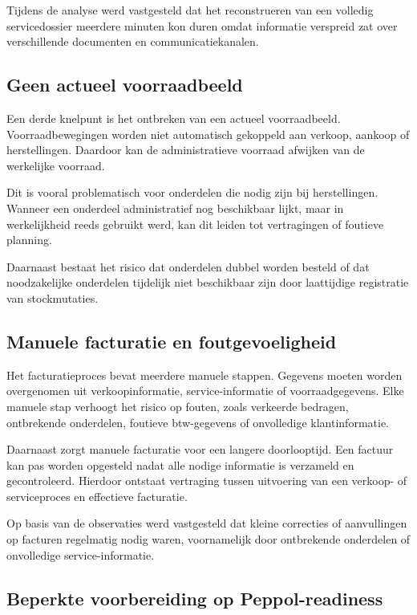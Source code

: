 Tijdens de analyse werd vastgesteld dat het reconstrueren van een volledig servicedossier meerdere minuten kon duren omdat informatie verspreid zat over verschillende documenten en communicatiekanalen.

\subsection{Geen actueel voorraadbeeld}

Een derde knelpunt is het ontbreken van een actueel voorraadbeeld. Voorraadbewegingen worden niet automatisch gekoppeld aan verkoop, aankoop of herstellingen. Daardoor kan de administratieve voorraad afwijken van de werkelijke voorraad.

Dit is vooral problematisch voor onderdelen die nodig zijn bij herstellingen. Wanneer een onderdeel administratief nog beschikbaar lijkt, maar in werkelijkheid reeds gebruikt werd, kan dit leiden tot vertragingen of foutieve planning.

Daarnaast bestaat het risico dat onderdelen dubbel worden besteld of dat noodzakelijke onderdelen tijdelijk niet beschikbaar zijn door laattijdige registratie van stockmutaties.

\subsection{Manuele facturatie en foutgevoeligheid}

Het facturatieproces bevat meerdere manuele stappen. Gegevens moeten worden overgenomen uit verkoopinformatie, service-informatie of voorraadgegevens. Elke manuele stap verhoogt het risico op fouten, zoals verkeerde bedragen, ontbrekende onderdelen, foutieve btw-gegevens of onvolledige klantinformatie.

Daarnaast zorgt manuele facturatie voor een langere doorlooptijd. Een factuur kan pas worden opgesteld nadat alle nodige informatie is verzameld en gecontroleerd. Hierdoor ontstaat vertraging tussen uitvoering van een verkoop- of serviceproces en effectieve facturatie.

Op basis van de observaties werd vastgesteld dat kleine correcties of aanvullingen op facturen regelmatig nodig waren, voornamelijk door ontbrekende onderdelen of onvolledige service-informatie.

\subsection{Beperkte voorbereiding op Peppol-readiness}


